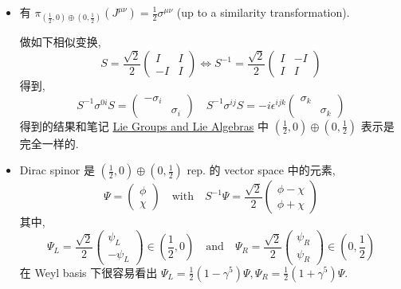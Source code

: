 \begin{itemize}
	\noindent\rule[0.5ex]{\linewidth}{0.5pt} %
	
	\item 有 $\pi_{(\frac{1}{2}, 0) \oplus (0, \frac{1}{2})}(J^{\mu \nu}) = \frac{1}{2} \sigma^{\mu \nu}$ (up to a similarity transformation).
	
	\begin{tcolorbox}[title=calculation:]
		做如下相似变换,
		\begin{equation} \label{6.2.2}
			S = \frac{\sqrt{2}}{2} \begin{pmatrix}
				I & I \\
				- I & I
			\end{pmatrix} \iff S^{- 1} = \frac{\sqrt{2}}{2} \begin{pmatrix}
				I & - I \\
				I & I
			\end{pmatrix}
		\end{equation}
		得到,
		\begin{equation}
			S^{- 1} \sigma^{0 i} S = \begin{pmatrix}
				- \sigma_i & \\
				& \sigma_i
			\end{pmatrix} \quad S^{- 1} \sigma^{i j} S = - i \epsilon^{i j k} \begin{pmatrix}
				\sigma_k & \\
				& \sigma_k
			\end{pmatrix}
		\end{equation}
		得到的结果和笔记 \href{https://github.com/siyang03/my-note---Lie-Groups-and-Lie-Algebras}{Lie Groups and Lie Algebras} 中 $(\frac{1}{2}, 0) \oplus (0, \frac{1}{2})$ 表示是完全一样的.
	\end{tcolorbox}
	
	\item Dirac spinor 是 $(\frac{1}{2}, 0) \oplus (0, \frac{1}{2})$ rep. 的 vector space 中的元素,
	\begin{equation}
		\Psi = \begin{pmatrix}
			\phi \\
			\chi
		\end{pmatrix} \quad \text{with} \quad S^{- 1} \Psi = \frac{\sqrt{2}}{2} \begin{pmatrix}
			\phi - \chi \\
			\phi + \chi
		\end{pmatrix}
	\end{equation}
	其中,
	\begin{equation}
		\Psi_L = \frac{\sqrt{2}}{2} \begin{pmatrix}
			\psi_L \\
			- \psi_L
		\end{pmatrix} \in (\frac{1}{2}, 0) \quad \text{and} \quad \Psi_R = \frac{\sqrt{2}}{2} \begin{pmatrix}
			\psi_R \\
			\psi_R
		\end{pmatrix} \in (0, \frac{1}{2})
	\end{equation}
	在 Weyl basis 下很容易看出 $\Psi_L = \frac{1}{2} (1 - \gamma^5) \Psi, \Psi_R = \frac{1}{2} (1 + \gamma^5) \Psi$.
	

\end{itemize}
